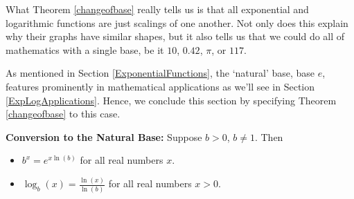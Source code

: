 \documentclass{ximera}
\begin{document}
What Theorem \ref{changeofbase} really tells us is that all exponential and logarithmic functions are just scalings of one another.  Not only does this explain why their graphs have similar shapes, but it also tells us that we could do all of mathematics with a single base,  be it $10$, $0.42$, $\pi$, or $117$. 

As mentioned in Section \ref{ExponentialFunctions}, the `natural' base, base $e$, features prominently in mathematical applications as we'll see in Section \ref{ExpLogApplications}.  Hence, we conclude this section by specifying  Theorem \ref{changeofbase} to this case.


\begin{theorem}  \label{allbasee} \textbf{Conversion to the Natural Base:}  Suppose $b>0$, $b \neq 1$. Then

\begin{itemize}

\item $b^{x} = e^{x \ln(b)}$ for all real numbers $x$. 

\item  $\log_{b}(x) = \frac{\ln(x)}{\ln(b)}$ for all real numbers $x > 0$.

\end{itemize}

\end{theorem}




\closegraphsfile
\end{document}
